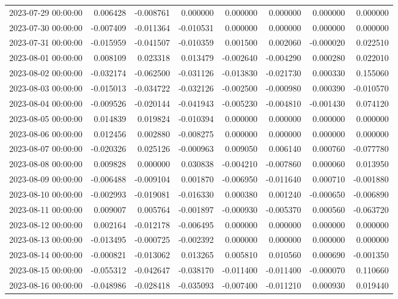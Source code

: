 \begin{tabular}{lrrrrrrr}
2023-07-29 00:00:00 & 0.006428 & -0.008761 & 0.000000 & 0.000000 & 0.000000 & 0.000000 & 0.000000 \\
2023-07-30 00:00:00 & -0.007409 & -0.011364 & -0.010531 & 0.000000 & 0.000000 & 0.000000 & 0.000000 \\
2023-07-31 00:00:00 & -0.015959 & -0.041507 & -0.010359 & 0.001500 & 0.002060 & -0.000020 & 0.022510 \\
2023-08-01 00:00:00 & 0.008109 & 0.023318 & 0.013479 & -0.002640 & -0.004290 & 0.000280 & 0.022010 \\
2023-08-02 00:00:00 & -0.032174 & -0.062500 & -0.031126 & -0.013830 & -0.021730 & 0.000330 & 0.155060 \\
2023-08-03 00:00:00 & -0.015013 & -0.034722 & -0.032126 & -0.002500 & -0.000980 & 0.000390 & -0.010570 \\
2023-08-04 00:00:00 & -0.009526 & -0.020144 & -0.041943 & -0.005230 & -0.004810 & -0.001430 & 0.074120 \\
2023-08-05 00:00:00 & 0.014839 & 0.019824 & -0.010394 & 0.000000 & 0.000000 & 0.000000 & 0.000000 \\
2023-08-06 00:00:00 & 0.012456 & 0.002880 & -0.008275 & 0.000000 & 0.000000 & 0.000000 & 0.000000 \\
2023-08-07 00:00:00 & -0.020326 & 0.025126 & -0.000963 & 0.009050 & 0.006140 & 0.000760 & -0.077780 \\
2023-08-08 00:00:00 & 0.009828 & 0.000000 & 0.030838 & -0.004210 & -0.007860 & 0.000060 & 0.013950 \\
2023-08-09 00:00:00 & -0.006488 & -0.009104 & 0.001870 & -0.006950 & -0.011640 & 0.000710 & -0.001880 \\
2023-08-10 00:00:00 & -0.002993 & -0.019081 & -0.016330 & 0.000380 & 0.001240 & -0.000650 & -0.006890 \\
2023-08-11 00:00:00 & 0.009007 & 0.005764 & -0.001897 & -0.000930 & -0.005370 & 0.000560 & -0.063720 \\
2023-08-12 00:00:00 & 0.002164 & -0.012178 & -0.006495 & 0.000000 & 0.000000 & 0.000000 & 0.000000 \\
2023-08-13 00:00:00 & -0.013495 & -0.000725 & -0.002392 & 0.000000 & 0.000000 & 0.000000 & 0.000000 \\
2023-08-14 00:00:00 & -0.000821 & -0.013062 & 0.013265 & 0.005810 & 0.010560 & 0.000690 & -0.001350 \\
2023-08-15 00:00:00 & -0.055312 & -0.042647 & -0.038170 & -0.011400 & -0.011400 & -0.000070 & 0.110660 \\
2023-08-16 00:00:00 & -0.048986 & -0.028418 & -0.035093 & -0.007400 & -0.011210 & 0.000930 & 0.019440 \\

\end{tabular}
